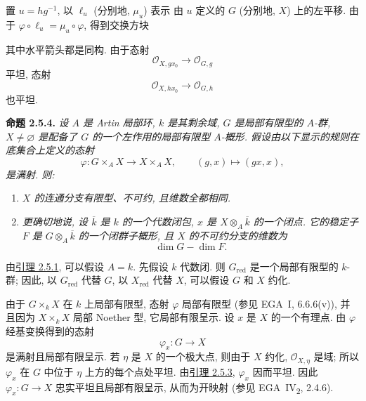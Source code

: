 置 \(u=hg^{-1}\),
以 \(\ell_u\) (分别地, \(\mu_u\)) 表示
由 \(u\) 定义的 \(G\) (分别地, \(X\)) 上的左平移.
由于 \(\varphi\circ\ell_u=\mu_u\circ\varphi\), 得到交换方块
\begin{center}
  \label{diag:sga3-VIA-2.5.3-translations}%
\end{center}
其中水平箭头都是同构. 由于态射
\[
  \mathcal O_{X,gx_0}\longrightarrow\mathcal O_{G,g}
\]
平坦, 态射
\[
  \mathcal O_{X,hx_0}\longrightarrow\mathcal O_{G,h}
\]
也平坦.

\medskip
{}\label{prop:sga3-VIA-2.5.4}%
\noindent\textbf{命题 2.5.4.}
\textit{设 \(A\) 是 Artin 局部环, \(k\) 是其剩余域,
\(G\) 是局部有限型的 \(A\)-群,
\(X\ne\varnothing\) 是配备了 \(G\) 的一个左作用的局部有限型 \(A\)-概形.
假设由以下显示的规则在底集合上定义的态射
\[
  \varphi:G\times_AX\longrightarrow X\times_AX,
  \qquad (g,x)\longmapsto(gx,x),
\]
是满射. 则:}
\begin{enumerate}
\item[(i)] \textit{\(X\) 的连通分支有限型、不可约, 且维数全都相同.}
\item[(ii)]\label{concl:sga3-VIA-2.5.4-ii}
\textit{更确切地说, 设 \(\overline{k}\) 是 \(k\) 的一个代数闭包,
\(x\) 是 \(X\otimes_A\overline{k}\) 的一个闭点.
它的稳定子 \(F\) 是 \(G\otimes_A\overline{k}\) 的一个闭群子概形,
且 \(X\) 的不可约分支的维数为
\[
  \dim G-\dim F.
\]}
\end{enumerate}

由\hyperref[lem:sga3-VIA-2.5.1]{引理 2.5.1}, 可以假设 \(A=k\).
先假设 \(k\) 代数闭.
则 \(G_{\mathrm{red}}\) 是一个局部有限型的 \(k\)-群;
因此, 以 \(G_{\mathrm{red}}\) 代替 \(G\),
以 \(X_{\mathrm{red}}\) 代替 \(X\),
可以假设 \(G\) 和 \(X\) 约化.

由于 \(G\times_kX\) 在 \(k\) 上局部有限型,
态射 \(\varphi\) 局部有限型 (参见 EGA~I, 6.6.6(v)),
并且因为 \(X\times_kX\) 局部 Noether 型, 它局部有限呈示.
设 \(x\) 是 \(X\) 的一个有理点.
由 \(\varphi\) 经基变换得到的态射
\[
  \varphi_x:G\longrightarrow X
\]
是满射且局部有限呈示.
若 \(\eta\) 是 \(X\) 的一个极大点,
则由于 \(X\) 约化, \(\mathcal O_{X,\eta}\) 是域;
所以 \(\varphi_x\) 在 \(G\) 中位于 \(\eta\) 上方的每个点处平坦.
由\hyperref[lem:sga3-VIA-2.5.3]{引理 2.5.3}, \(\varphi_x\) 因而平坦.
因此 \(\varphi_x:G\to X\) 忠实平坦且局部有限呈示,
从而为开映射 (参见 EGA~IV\textsubscript{2}, 2.4.6).

